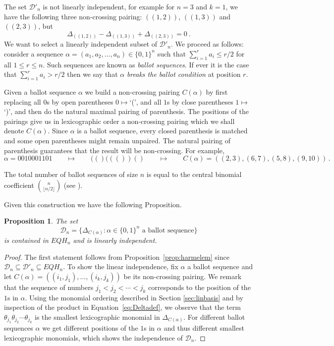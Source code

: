 \documentclass[submission]{FPSAC2023}
\newcommand{\defncolor}{\color{darkred}}
\newcommand{\defn}[1]{{\defncolor\emph{#1}}} %
\newtheorem{prop}[theorem]{Proposition}
\theoremstyle{definition}
\numberwithin{equation}{section}
\begin{document}
The set ${\mathcal D}'_n$ is not linearly independent, for example for $n=3$ and $k=1$, we have the following three non-crossing pairing:
$((1,2))$, $((1,3))$ and $((2,3))$, but
\[
\Delta_{((1,2))} - \Delta_{((1,3))} + \Delta_{((2,3))} =0 ~.
\]
We want to select a linearly independent subset of ${\mathcal D}'_n$. We proceed as follows:
consider a sequence
$\alpha = (a_1, a_2, \ldots, a_n) \in \{0, 1\}^n$
such that $\sum_{i=1}^r a_i \leq r/2$ for all $1 \leq r \leq n$.
Such sequences are known as \defn{ballot sequences}.
If ever it is the case that $\sum_{i=1}^r a_i > r/2$ then we say that
$\alpha$ \defn{breaks the ballot condition} at position $r$.

Given a ballot sequence $\alpha$ we build a non-crossing pairing $C(\alpha)$ by first replacing all $0$s
by open parentheses $0\mapsto$`(',
and all $1$s by close parentheses $1\mapsto$`)',
and then do the natural maximal pairing of parenthesis. The positions of the pairings
give us in lexicographic order a non-crossing pairing which we shall denote $C(\alpha)$.
Since $\alpha$ is a ballot sequence, every closed parenthesis is matched
and some open parentheses might remain unpaired.
The natural pairing of parenthesis guarantees that the result will be non-crossing. For example,
\[
\alpha=0010001101 \qquad\mapsto\qquad (()((())() \qquad\mapsto\qquad C(\alpha)=((2,3),(6,7),(5,8),(9,10)) \,.
\]

The total number of ballot sequences of size $n$ is equal to the central binomial coefficient $\binom{n}{\lfloor{n/2}\rfloor}$
(see \cite[\href{https://oeis.org/A001405}{A001405}]{OEIS}).

Given this construction we have the following Proposition.

\begin{prop}\label{prop:harmbasis}
The set
$${\mathcal D}_n =\big\{ \Delta_{C(\alpha)}:  \alpha \in \{0, 1\}^n \text{ a ballot sequence}\big\}
$$
is contained in $EQH_n$ and is linearly independent.
\end{prop}

\begin{proof}
  The first statement follows from Proposition~\ref{prop:harmelem} since ${\mathcal D}_n \subseteq {\mathcal D}'_n \subseteq EQH_n$.
To show the linear independence, fix $\alpha$ a ballot sequence and let $C(\alpha)=((i_1,j_1),\ldots,(i_k,j_k))$ be its non-crossing pairing.  We remark that the sequence of numbers
$j_1<j_2<\cdots<j_k$ corresponds to the position of the $1$s in $\alpha$.
Using the monomial ordering described in Section \ref{sec:linbasis}
and by inspection of the product in Equation~\eqref{eq:Deltadef},
we observe that the term $\theta_{j_1}\theta_{j_2}\cdots\theta_{j_k}$ is the smallest lexicographic
monomial in $\Delta_{C(\alpha)}$.
For different ballot sequences $\alpha$ we get different positions of the $1$s in
$\alpha$ and thus different smallest lexicographic monomials,
which shows the independence of ${\mathcal D}_n$.
\end{proof}
\end{document}
